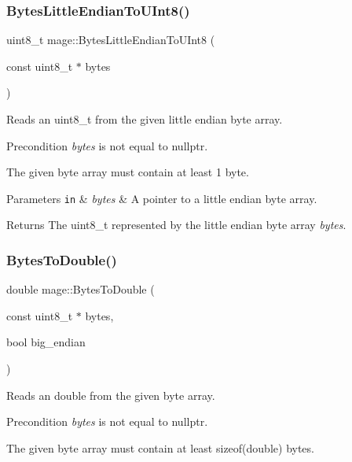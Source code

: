 \subsubsection{\texorpdfstring{Bytes\+Little\+Endian\+To\+U\+Int8()}{BytesLittleEndianToUInt8()}}
{\footnotesize\ttfamily uint8\+\_\+t mage\+::\+Bytes\+Little\+Endian\+To\+U\+Int8 (\begin{DoxyParamCaption}\item[{const uint8\+\_\+t $\ast$}]{bytes }\end{DoxyParamCaption})\hspace{0.3cm}{\ttfamily [noexcept]}}

Reads an uint8\+\_\+t from the given little endian byte array.

\begin{DoxyPrecond}{Precondition}
{\itshape bytes} is not equal to {\ttfamily nullptr}. 

The given byte array must contain at least 1 byte. 
\end{DoxyPrecond}

\begin{DoxyParams}[1]{Parameters}
\mbox{\tt in}  & {\em bytes} & A pointer to a little endian byte array. \\
\hline
\end{DoxyParams}
\begin{DoxyReturn}{Returns}
The {\ttfamily uint8\+\_\+t} represented by the little endian byte array {\itshape bytes}. 
\end{DoxyReturn}
\hypertarget{namespacemage_ae0813ad421fca47762e1c6b5b4f78ae7}{}\label{namespacemage_ae0813ad421fca47762e1c6b5b4f78ae7} 
\subsubsection{\texorpdfstring{Bytes\+To\+Double()}{BytesToDouble()}}
{\footnotesize\ttfamily double mage\+::\+Bytes\+To\+Double (\begin{DoxyParamCaption}\item[{const uint8\+\_\+t $\ast$}]{bytes,  }\item[{bool}]{big\+\_\+endian }\end{DoxyParamCaption})\hspace{0.3cm}{\ttfamily [noexcept]}}

Reads an double from the given byte array.

\begin{DoxyPrecond}{Precondition}
{\itshape bytes} is not equal to {\ttfamily nullptr}. 

The given byte array must contain at least {\ttfamily sizeof(double)} bytes. 
\end{DoxyPrecond}

